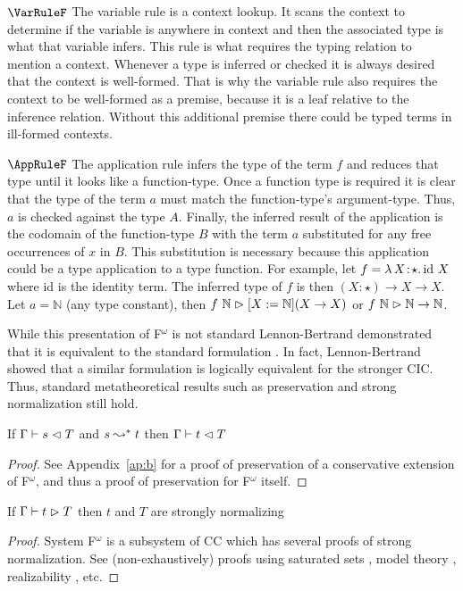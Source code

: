 $\VarRuleF$ The variable rule is a context lookup.
It scans the context to determine if the variable is anywhere in context and then the associated type is what that variable infers.
This rule is what requires the typing relation to mention a context.
Whenever a type is inferred or checked it is always desired that the context is well-formed.
That is why the variable rule also requires the context to be well-formed as a premise, because it is a leaf relative to the inference relation.
Without this additional premise there could be typed terms in ill-formed contexts.

$\AppRuleF$ The application rule infers the type of the term $f$ and reduces that type until it looks like a function-type.
Once a function type is required it is clear that the type of the term $a$ must match the function-type's argument-type.
Thus, $a$ is checked against the type $A$.
Finally, the inferred result of the application is the codomain of the function-type $B$ with the term $a$ substituted for any free occurrences of $x$ in $B$.
This substitution is necessary because this application could be a type application to a type function.
For example, let $f = {\lambda}\, X\! : \! \star.\, \text{id}\ X$ where id is the identity term.
The inferred type of $f$ is then $(X : \star) \to X \to X$.
Let $a = \mathbb{N}$ (any type constant), then $f\ \mathbb{N} \vartriangleright [X := \mathbb{N}](X \to X)$ or $f\ \mathbb{N} \infr \mathbb{N} \to \mathbb{N}$.

While this presentation of F$^\omega$ is not standard Lennon-Bertrand demonstrated that it is equivalent to the standard formulation \cite{lennon2021}.
In fact, Lennon-Bertrand showed that a similar formulation is logically equivalent for the stronger CIC.
Thus, standard metatheoretical results such as preservation and strong normalization still hold.

\begin{lemma}
    If $\Gamma \vdash s \vartriangleleft T$ and $s \leadsto^* t$ then $\Gamma \vdash t \vartriangleleft T$
\end{lemma}
\begin{proof}
    See Appendix~\ref{ap:b} for a proof of preservation of a conservative extension of F$^\omega$, and thus a proof of preservation for F$^\omega$ itself.
\end{proof}

\begin{theorem}
    If $\Gamma \vdash t \vartriangleright T$ then $t$ and $T$ are strongly normalizing
\end{theorem}
\begin{proof}
    System F$^\omega$ is a subsystem of CC which has several proofs of strong normalization.
    See (non-exhaustively) proofs using saturated sets \cite{geuvers1994_sn_satset}, model theory \cite{terlouw1995_sn}, realizability \cite{ong1993}, etc.
\end{proof}

